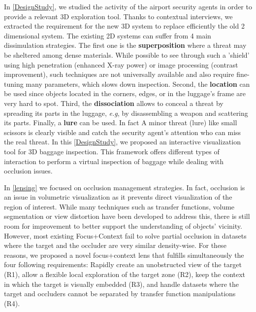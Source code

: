  
In \autoref{DesignStudy}, we studied the activity of the airport security agents in order to provide a relevant 3D exploration tool. Thanks to contextual interviews, we extracted the requirement for the new 3D system  to replace efficiently  the old 2 dimensional system. The existing 2D systems can suffer from 4 main dissimulation strategies. The first one is the \textbf{superposition} where a threat may be sheltered among dense materials. While possible to see through such a 'shield' using high penetration (enhanced X-ray power) or image processing (contrast improvement), such techniques are not universally available and also require fine-tuning many parameters, which slows down inspection. Second, the \textbf{location} can be used since objects located in the corners, edges, or in the luggage's frame are very hard to spot. Third, the \textbf{dissociation} allows to conceal a threat by spreading its parts in the luggage, \emph{e.g}, by disassembling a weapon and scattering its parts. Finally, a \textbf{lure} can be used. In fact A minor threat (lure) like small scissors is clearly visible and catch the security agent's attention who can miss the real threat. In this \autoref{DesignStudy}, we proposed an interactive visualization tool for 3D baggage inspection. This framework offers different types of interaction to perform a virtual inspection of baggage while dealing with occlusion issues.



In \autoref{lensing} we focused on occlusion management strategies. In fact, occlusion is an issue in volumetric visualization as it prevents direct visualization of the region of interest. While many techniques such as transfer functions, volume segmentation or view distortion have been developed to address this, there is still room for improvement to better support the understanding of objects' vicinity. However, most existing Focus+Context fail to solve partial occlusion in datasets where the target and the occluder are very similar density-wise. For these reasons, we proposed a novel focus+context lens that fulfills simultaneously the four following requirements: Rapidly create an unobstructed view of the target (R1), allow a flexible local exploration of the target zone (R2), keep the context in which the target is visually embedded (R3), and handle datasets where the target and occluders cannot  be separated by transfer function manipulations (R4).



